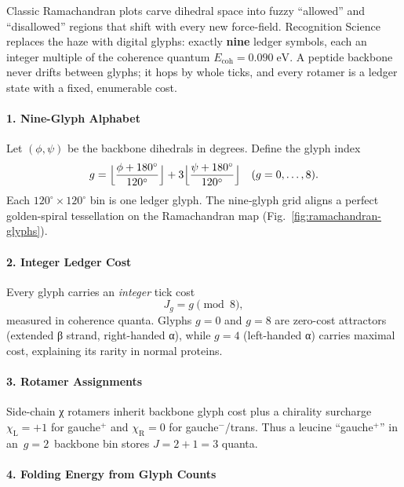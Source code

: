 \documentclass[11pt,oneside]{book}
\begin{document}
Classic Ramachandran plots carve dihedral space into fuzzy
“allowed” and “disallowed” regions that shift with every new
force-field.  
Recognition Science replaces the haze with digital glyphs:
exactly \textbf{nine} ledger symbols, each an integer multiple of the
coherence quantum \(E_{\text{coh}} = 0.090\;\text{eV}\).
A peptide backbone never drifts between glyphs; it hops by whole ticks,
and every rotamer is a ledger state with a fixed, enumerable cost.

\paragraph*{1. Nine-Glyph Alphabet}

Let \((\phi,\psi)\) be the backbone dihedrals in degrees.
Define the glyph index
\[
   g = \Bigl\lfloor
          \frac{\phi + 180^\circ}{120^\circ}
       \Bigr\rfloor
     + 3\Bigl\lfloor
          \frac{\psi + 180^\circ}{120^\circ}
       \Bigr\rfloor
   \quad (g = 0,\dots,8).
\]
Each \(120^\circ\times120^\circ\) bin is one ledger glyph.
The nine‐glyph grid aligns a perfect golden-spiral tessellation on the
Ramachandran map (Fig.~\ref{fig:ramachandran-glyphs}).

\paragraph*{2. Integer Ledger Cost}

Every glyph carries an \emph{integer} tick cost
\[
   J_g = g \pmod{8},
\]
measured in coherence quanta.  
Glyphs \(g=0\) and \(g=8\) are zero-cost attractors
(extended β strand, right-handed α),  
while \(g=4\) (left-handed α) carries maximal cost, explaining its
rarity in normal proteins.

\paragraph*{3. Rotamer Assignments}

Side-chain χ rotamers inherit backbone glyph cost plus a chirality surcharge
\(\chi_{\text{L}} = +1\) for gauche\(^+\) and
\(\chi_{\text{R}} = 0\) for gauche\(^-\)/trans.
Thus a leucine “gauche\(^+\)” in an $\,g=2\,$ backbone bin stores
\(J = 2 + 1 = 3\) quanta.

\paragraph*{4. Folding Energy from Glyph Counts}
\end{document}
